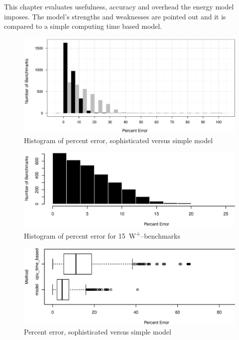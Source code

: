 \label{sec:evaluation}

This chapter evaluates usefulness, accuracy and overhead the energy model
imposes. The model's strengths and weaknesses are pointed out and it is compared
to a simple computing time based model.


\label{sec:error}

\begin{figure}
  \centering
    \includegraphics[width=\textwidth]{fig/hist-models.eps}
  \caption{Histogram of percent error, sophisticated versus simple model}
  \label{fig:err-hist}
\end{figure}

\begin{figure}
  \centering
    \includegraphics[width=\textwidth]{fig/hist-model-15W.eps}
  \caption{Histogram of percent error for \SI{15}{\watt}\textsuperscript{+}--benchmarks}
  \label{fig:err-hist-15}
\end{figure}

\begin{figure}
  \centering
    \includegraphics[width=\textwidth]{fig/Ncpu-bench-errs.eps}
  \caption{Percent error, sophisticated versus simple model}
  \label{fig:errs-ncpu}
\end{figure}

